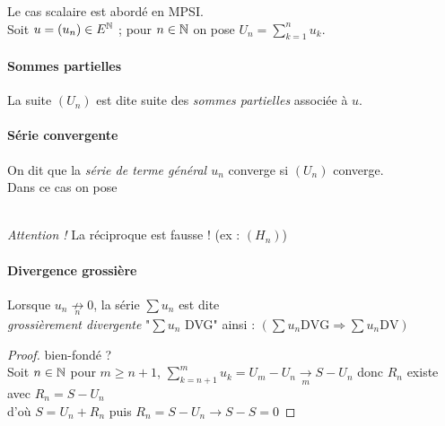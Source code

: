 		
		Le cas scalaire est abordé en MPSI. \\

		Soit $u = (u_n) \in E^{{\mathbb{N}}}$ ; pour $n \in {\mathbb{N}}$ on pose $U_n = \sum_{k=1}^{n} u_k$. 
		
		\newpage
		
		\traitd
		\paragraph{Sommes partielles} La suite $(U_n)$ est dite suite des \emph{sommes partielles} associée à $u$.
		\traitdouble
		\paragraph{Série convergente} On dit que la \emph{série de terme général $u_n$} converge si $\left(U_n\right)$ converge.
			\\\hspace*{2cm} Dans ce cas on pose $~$ 
		\trait
		
		 \\ 
		\emph{Attention !} La réciproque est fausse ! (ex : $(H_n)$)
		
		\traitd
		\paragraph{Divergence grossière}
			Lorsque $u_n \underset{n}{\not\rightarrow} 0$, la série $\sum u_n$ est dite \\
			\emph{grossièrement divergente} "$\sum u_n$ DVG" ainsi : $\left(\sum u_n \mathrm{DVG} \Rightarrow \sum u_n \mathrm{DV} \right)$
		\trait

			
		\begin{proof}
			bien-fondé ?\\Soit $n\in{\mathbb{N}}$ pour $m\geq n+1$, $\sum_{k=n+1}^{m} u_k = U_m - U_n \underset{m}{\rightarrow} S-U_n$ donc $R_n$ existe 
			avec $R_n = S-U_n$ \\d'où $S=U_n+R_n$ 
			puis $R_n = S-U_n \to S-S=0$
		\end{proof} \medskip
		
